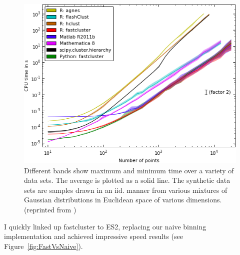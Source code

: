 \begin{figure}[h!]
\centering
\includegraphics[scale=0.75]{images/FastComplete-CH3}
\caption[Complete linkage clustering speed comparison between popular implementations.]{Different bands show maximum and minimum time over a variety of data sets. The average is plotted as a solid line. The synthetic data sets are samples drawn in an iid. manner from various mixtures of Gaussian distributions in Euclidean space of various dimensions.
(reprinted from \protect\cite{FastClust})}
\label{fig:FastClustComparison}
\end{figure}

I quickly linked up fastcluster to ES2, replacing our naive binning implementation and achieved impressive speed results (see Figure~\ref{fig:FastVsNaive}).

